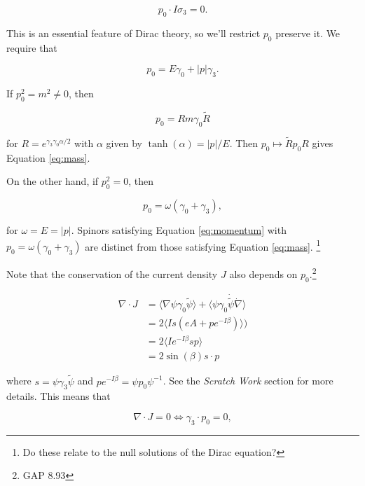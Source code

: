\documentclass{article}
\begin{document}
  \begin{equation}
    p_0 \cdot I\sigma_3 = 0.
  \end{equation} 

  This is an essential feature of Dirac theory, so we'll restrict $p_0$ preserve it. We require that

  \begin{equation}
    p_0 = E \gamma_0 + |p| \gamma_3.
  \end{equation} 

  If $p_0^2 = m^2 \not= 0$, then 

  \begin{equation}
    p_0 = R m \gamma_0 \widetilde R
  \end{equation} 

  for $R = e^{\gamma_3 \gamma_0 \alpha/2}$ with $\alpha$ given by $\tanh(\alpha) = |p|/E$. Then $p_0 \mapsto \widetilde R p_0 R$ gives Equation \ref{eq:mass}.

  On the other hand, if $p_0^2 = 0$, then

  \begin{equation}
    p_0 = \omega (\gamma_0 + \gamma_3), \label{eq:massless}
  \end{equation}

  for $\omega = E = |p|$. Spinors satisfying Equation \ref{eq:momentum} with $p_0 = \omega(\gamma_0 + \gamma_3)$ are distinct from those satisfying Equation \ref{eq:mass}. \footnote{Do these relate to the null solutions of the Dirac equation?}

  Note that the conservation of the current density $J$ also depends on $p_0$.\footnote{GAP 8.93}

  \begin{align}
    \nabla \cdot J &= \langle \nabla \psi \gamma_0 \widetilde \psi \rangle + \langle \psi \gamma_0 \dot{\widetilde{\psi}} \dot \nabla \rangle\\
    &= 2 \langle I s (e A + p e^{-I \beta}) \rangle) \\
    &= 2 \langle I e^{-I \beta} s p \rangle \\
    &= 2 \sin(\beta) s \cdot p
  \end{align}

  where $s = \psi \gamma_3 \widetilde \psi$ and $p e^{-I\beta} = \psi p_0 \psi^{-1}$. See the \emph{Scratch Work} section for more details. This means that 

  \begin{equation}
    \nabla \cdot J = 0 \iff \gamma_3 \cdot p_0 = 0,
  \end{equation} 
\end{document}

